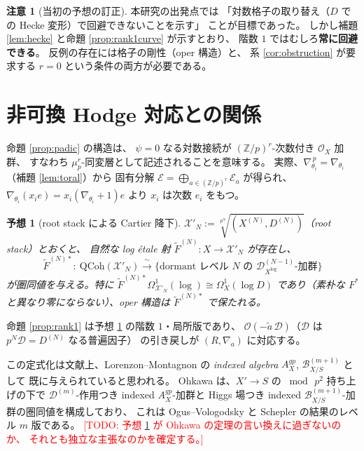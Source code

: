 \documentclass[a4paper,11pt]{ltjsarticle}
\theoremstyle{plain}
\newtheorem{conjecture}[theorem]{予想}
\theoremstyle{definition}
\newtheorem{remark}[theorem]{注意}
\newcommand{\Todo}[1]{\textcolor{red}{\textsf{[TODO: #1]}}}
\newcommand{\bbZ}{\mathbb{Z}}
\newcommand{\cD}{\mathcal{D}}
\newcommand{\cE}{\mathcal{E}}
\newcommand{\cO}{\mathcal{O}}
\newcommand{\Dlog}[1]{\cD^{(#1)}_{X^{\log}}}
\begin{document}
\begin{remark}[当初の予想の訂正]
本研究の出発点では
「対数格子の取り替え（$D$ での Hecke 変形）で回避できないことを示す」
ことが目標であった。
しかし補題 \ref{lem:hecke} と命題 \ref{prop:rank1curve} が示すとおり、
階数 $1$ ではむしろ\textbf{常に回避できる}。
反例の存在には格子の剛性（oper 構造）と、
系 \ref{cor:obstruction} が要求する $r=0$ という条件の両方が必要である。
\end{remark}

\section{非可換 Hodge 対応との関係}\label{sec:NAHT}

命題 \ref{prop:padic} の構造は、
$\psi=0$ なる対数接続が $(\bbZ/p)^r$-次数付き $\cO_X$ 加群、
すなわち $\mu_p^r$-同変層として記述されることを意味する。
実際、$\nabla_{\theta_i}^{\,p}=\nabla_{\theta_i}$（補題 \ref{lem:toral}）から
固有分解 $\cE=\bigoplus_{a\in(\bbZ/p)^r}\cE_a$ が得られ、
$\nabla_{\theta_i}(x_ie)=x_i(\nabla_{\theta_i}+1)e$ より
$x_i$ は次数 $e_i$ をもつ。

\begin{conjecture}[root stack による Cartier 降下]\label{conj:rootstack}
$\mathcal{X}'_N:=\sqrt[p^N]{(X^{(N)},D^{(N)})}$（root stack）とおくと、
自然な log étale 射 $\widetilde F^{(N)}:X\to\mathcal{X}'_N$ が存在し、
\[
  \widetilde F^{(N)*}:\ \mathrm{QCoh}(\mathcal{X}'_N)
  \xrightarrow{\ \sim\ }\bigl\{\text{dormant レベル }N\text{ の }\Dlog{N-1}\text{-加群}\bigr\}
\]
が圏同値を与える。特に
$\widetilde F^{(N)*}\Omega^1_{\mathcal{X}'_N}(\log)\cong\Omega^1_X(\log D)$
であり（素朴な $F^*$ と異なり零にならない）、oper 構造は $\widetilde F^{(N)*}$ で保たれる。
\end{conjecture}

命題 \ref{prop:rank1} は予想 \ref{conj:rootstack} の階数 $1$・局所版であり、
$\cO(-\tilde a\,\mathcal{D})$（$\mathcal{D}$ は $p^N\mathcal{D}=D^{(N)}$ なる普遍因子）
の引き戻しが $(R,\nabla_a)$ に対応する。

この定式化は文献上、Lorenzon--Montagnon の
\emph{indexed algebra} $A^{gp}_X$, $\mathcal{B}^{(m+1)}_{X/S}$ として
既に与えられていると思われる。
Ohkawa \cite{Ohk} は、$X'\to S$ の $\bmod\,p^2$ 持ち上げの下で
$\cD^{(m)}$-作用つき indexed $A^{gp}_X$-加群と
Higgs 場つき indexed $\mathcal{B}^{(m+1)}_{X/S}$-加群の圏同値を構成しており、
これは Ogus--Vologodsky \cite{OV} と Schepler \cite{Sch} の結果のレベル $m$ 版である。
\Todo{予想 \ref{conj:rootstack} が Ohkawa の定理の言い換えに過ぎないのか、
それとも独立な主張なのかを確定する。}
\end{document}
